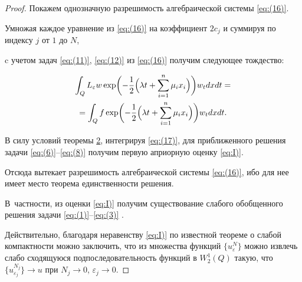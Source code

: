\begin{proof}
Покажем  однозначную  разрешимость алгебраической системы \eqref{eq:(16)}. 

Умножая  каждое уравнение из \eqref{eq:(16)} на коэффициент $2{{c}_{j}}$ и суммируя по индексу $j$ от $1$ до $N$, 

c учетом задач \eqref{eq:(11)}, \eqref{eq:(12)} из \eqref{eq:(16)} получим  следующее тождество:

\begin{multline}

\label{eq:(17)}

\int _{Q}{{{L}_{\varepsilon }}}w

\exp \biggl(-

\frac{1}{2} \Bigl(\lambda t+\sum\limits_{i=1}^{n}{{{\mu }_{i}}{{x}_{i}}} \Bigr) \biggr)

{{w}_{t}}dxdt= 

\\

= \int _{Q}f \exp \biggl(-

\frac{1}{2} \Bigl(\lambda t+\sum\limits_{i=1}^{n}{{{\mu }_{i}}{{x}_{i}}} \Bigr) \biggr)

{{w}_{t}}dxdt.

\end{multline}

В силу условий теоремы  \hyperlink{dzh:th2}{2}, интегрируя \eqref{eq:(17)}, для приближенного решения задачи \eqref{eq:(6)}--\eqref{eq:(8)} получим   первую априорную оценку \eqref{eq:I)}.

%


%




Отсюда вытекает разрешимость алгебраической системы \eqref{eq:(16)}, ибо для нее имеет место теорема единственности решения.  

В~частности, из  оценки \eqref{eq:I)} получим существование слабого обобщенного  решения задачи \eqref{eq:(1)}--\eqref{eq:(3)} \cite{dzhamalov:8, dzhamalov:10}. 

Действительно, благодаря  неравенству \eqref{eq:I)}  по известной теореме о слабой компактности можно заключить, что из множества функций $\bigl\{ u_{\varepsilon }^{N} \bigr\}$ можно извлечь слабо сходящуюся  подпоследовательность функций в  $W_{2}^{1}(Q)$ такую, что $\bigl\{ u_{\varepsilon _j}^{N_j}  \bigr\}\to u$ при ${{N}_{j}}\to 0$,  ${{\varepsilon }_{j}}\to 0.$  


\end{proof}
